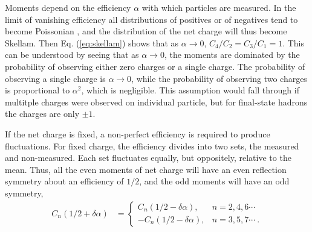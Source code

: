 Moments depend on the efficiency $\alpha$ with which particles are measured. In the limit of vanishing efficiency all distributions of positives or of negatives tend to become Poissonian \cite{Bzdak:2012ab}, and the distribution of the net charge will thus become Skellam. Then Eq. (\ref{eq:skellam}) shows that as $\alpha\rightarrow 0$, $C_4/C_2=C_3/C_1=1$. This can be understood by seeing that as $\alpha\rightarrow 0$, the moments are dominated by the probability of observing either zero charges or a single charge. The probability of observing a single charge is $\alpha\rightarrow 0$, while the probability of observing two charges is proportional to $\alpha^2$, which is negligible. This assumption would fall through if multitple charges were observed on individual particle, but for final-state hadrons the charges are only $\pm 1$.

If the net charge is fixed, a non-perfect efficiency is required to produce fluctuations. For fixed charge, the efficiency divides into two sets, the measured and non-measured. Each set fluctuates equally, but oppositely, relative to the mean. Thus, all the even moments of net charge will have an even reflection symmetry about an efficiency of $1/2$, and the odd moments will have an odd symmetry,
\begin{eqnarray}
\label{eq:alphasymm}
C_n(1/2+\delta\alpha)&=\left\{\begin{array}{rl}
C_n(1/2-\delta\alpha),&n=2,4,6\cdots\\
-C_n(1/2-\delta\alpha),&n=3,5,7\cdots~.\end{array}\right.
\end{eqnarray}
